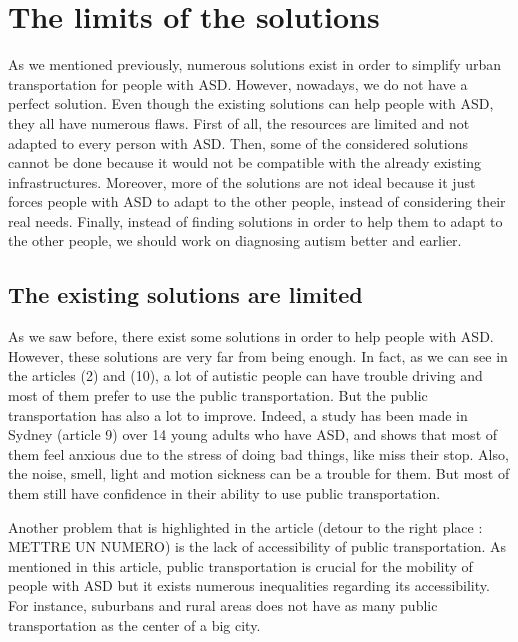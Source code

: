\section{The limits of the solutions}
As we mentioned previously, numerous solutions exist in order to simplify urban transportation for people with ASD. However, nowadays, we do not have a perfect solution. Even though the existing solutions can help people with ASD, they all have numerous flaws. First of all, the resources are limited and not adapted to every person with ASD. Then, some of the considered solutions cannot be done because it would not be compatible with the already existing infrastructures. Moreover, more of the solutions are not ideal because it just forces people with ASD to adapt to the other people, instead of considering their real needs. Finally, instead of finding solutions in order to help them to adapt to the other people, we should work on diagnosing autism better and earlier.
\subsection{The existing solutions are limited}
As we saw before, there exist some solutions in order to help people with ASD. However, these solutions are very far from being enough. In fact, as we can see in the articles (2) and (10), a lot of autistic people can have trouble driving and most of them prefer to use the public transportation. But the public transportation has also a lot to improve. Indeed, a study has been made in Sydney (article 9) over 14 young adults who have ASD, and shows that most of them feel anxious due to the stress of doing bad things, like miss their stop. Also, the noise, smell, light and motion sickness can be a trouble for them. But most of them still have confidence in their ability to use public transportation.

Another problem that is highlighted in the article (detour to the right place : METTRE UN NUMERO) is the lack of accessibility of public transportation. As mentioned in this article, public transportation is crucial for the mobility of people with ASD but it exists numerous inequalities regarding its accessibility. For instance, suburbans and rural areas does not have as many public transportation as the center of a big city.

